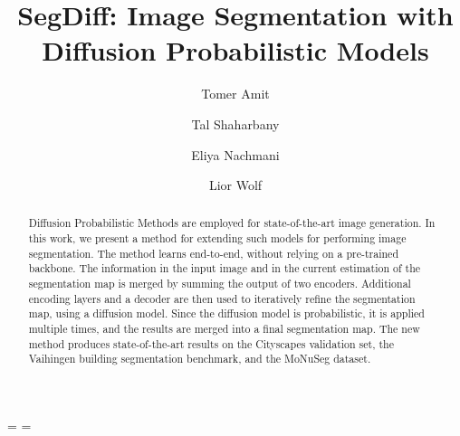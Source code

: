 \documentclass[10pt,twocolumn,letterpaper]{article}
\begin{document}
\title{SegDiff: Image Segmentation with Diffusion Probabilistic Models}

\makeatletter
\newcommand\email[2][]%
   {\newaffiltrue\let\AB@blk@and\AB@pand
      \if\relax#1\relax\def\AB@note{\AB@thenote}\else\def\AB@note{\relax}%
        \setcounter{Maxaffil}{0}\fi
      \begingroup
        \let\protect\@unexpandable@protect
        \def\thanks{\protect\thanks}\def\footnote{\protect\footnote}%
        \@temptokena=\expandafter{\AB@authors}%
        {\def\\{\protect\\\protect\Affilfont}\xdef\AB@temp{#2}}%
         \xdef\AB@authors{\the\@temptokena\AB@las\AB@au@str
         \protect\\[\affilsep]\protect\Affilfont\AB@temp}%
         \gdef\AB@las{}\gdef\AB@au@str{}%
        {\def\\{, \ignorespaces}\xdef\AB@temp{#2}}%
        \@temptokena=\expandafter{\AB@affillist}%
        \xdef\AB@affillist{\the\@temptokena \AB@affilsep
          \AB@affilnote{}\protect\Affilfont\AB@temp}%
      \endgroup
       \let\AB@affilsep\AB@affilsepx
}
\makeatother

\author[1]{Tomer Amit} 
\author[1]{Tal Shaharbany}
\author[1,2]{Eliya Nachmani}
\author[1]{Lior Wolf}
\email{\url{{tomeramit1,shaharabany,eliyan,wolf}@mail.tau.ac.il}}


\maketitle

\begin{abstract}
   Diffusion Probabilistic Methods are employed for state-of-the-art image generation. In this work, we present a method for extending such models for performing image segmentation. The method learns end-to-end, without relying on a pre-trained backbone. The information in the input image and in the current estimation of the segmentation map is merged by summing the output of two encoders. Additional encoding layers and a decoder are then used to iteratively refine the segmentation map, using a diffusion model. Since the diffusion model is probabilistic, it is applied multiple times, and the results are merged into a final segmentation map. The new method produces state-of-the-art results on the Cityscapes validation set, the Vaihingen building segmentation benchmark, and the MoNuSeg dataset.
\end{abstract}
\end{document}
